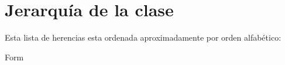 \section{Jerarquía de la clase}
Esta lista de herencias esta ordenada aproximadamente por orden alfabético\+:\begin{DoxyCompactList}
\item Form\begin{DoxyCompactList}
\item {}
\end{DoxyCompactList}
\end{DoxyCompactList}

